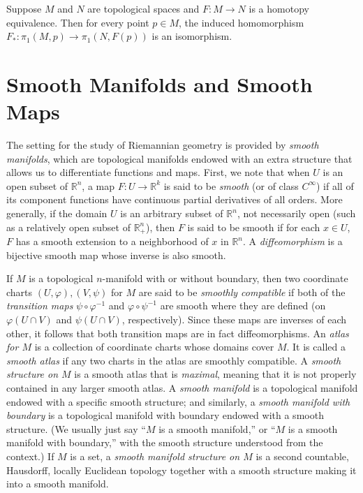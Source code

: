 \begin{proposition}
\label{prop:homotopy-invariance-fundamental-group}
Suppose $M$ and $N$ are topological spaces and $F: M \to N$ is a
homotopy equivalence. Then for every point $p \in M$, the induced homomorphism
$F_*: \pi_1(M, p) \to \pi_1(N, F(p))$ is an isomorphism.
\end{proposition}

\section{Smooth Manifolds and Smooth Maps}

The setting for the study of Riemannian geometry is provided by \emph{smooth manifolds}, which are topological manifolds endowed with an extra structure that allows us to differentiate functions and maps. First, we note that when $U$ is an open subset of $\mathbb{R}^n$, a map $F : U \to \mathbb{R}^k$ is said to be \emph{smooth} (or of class $C^\infty$) if all of its component functions have continuous partial derivatives of all orders. More generally, if the domain $U$ is an arbitrary subset of $\mathbb{R}^n$, not necessarily open (such as a relatively open subset of $\mathbb{R}^n_+$), then $F$ is said to be smooth if for each $x \in U$, $F$ has a smooth extension to a neighborhood of $x$ in $\mathbb{R}^n$. A \emph{diffeomorphism} is a bijective smooth map whose inverse is also smooth.

If $M$ is a topological $n$-manifold with or without boundary, then two coordinate charts $(U, \varphi), (V, \psi)$ for $M$ are said to be \emph{smoothly compatible} if both of the \emph{transition maps} $\psi \circ \varphi^{-1}$ and $\varphi \circ \psi^{-1}$ are smooth where they are defined (on $\varphi(U \cap V)$ and $\psi(U \cap V)$, respectively). Since these maps are inverses of each other, it follows that both transition maps are in fact diffeomorphisms. An \emph{atlas for $M$} is a collection of coordinate charts whose domains cover $M$. It is called a \emph{smooth atlas} if any two charts in the atlas are smoothly compatible. A \emph{smooth structure on $M$} is a smooth atlas that is \emph{maximal}, meaning that it is not properly contained in any larger smooth atlas. A \emph{smooth manifold} is a topological manifold endowed with a specific smooth structure; and similarly, a \emph{smooth manifold with boundary} is a topological manifold with boundary endowed with a smooth structure. (We usually just say ``$M$ is a smooth manifold,'' or ``$M$ is a smooth manifold with boundary,'' with the smooth structure understood from the context.) If $M$ is a set, a \emph{smooth manifold structure on $M$} is a second countable, Hausdorff, locally Euclidean topology together with a smooth structure making it into a smooth manifold.

